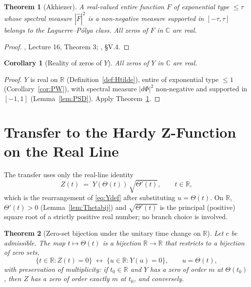 \documentclass[11pt]{article}
\newtheorem{theorem}{Theorem}
\newtheorem{corollary}{Corollary}
\begin{document}
\begin{theorem}[Akhiezer]\label{thm:akhiezer}
A real-valued entire function $F$ of exponential type $\le\tau$ whose spectral measure $|\hat F|^2$ is a non-negative measure supported in $[-\tau,\tau]$ belongs to the Laguerre--P\'olya class. All zeros of $F$ in $\mathbb{C}$ are real.
\end{theorem}

\begin{proof}\cite{Levin}, Lecture 16, Theorem 3; \cite{Akhiezer}, \S V.4.\end{proof}

\begin{corollary}[Reality of zeros of $Y$]\label{cor:Hzero}
All zeros of $Y$ in $\mathbb{C}$ are real.
\end{corollary}

\begin{proof}
$Y$ is real on $\mathbb{R}$ (Definition~\ref{def:Htilde}), entire of exponential type $\le 1$ (Corollary~\ref{cor:PW}), with spectral measure $|d\Phi|^2$ non-negative and supported in $[-1,1]$ (Lemma~\ref{lem:PSD}). Apply Theorem~\ref{thm:akhiezer}.
\end{proof}

\section{Transfer to the Hardy Z-Function on the Real Line}

The transfer uses only the real-line identity
\begin{equation}\label{eq:UTCreal}
Z(t) \;=\; Y(\Theta(t))\,\sqrt{\Theta'(t)},\qquad t\in\mathbb{R},
\end{equation}
which is the rearrangement of \eqref{eq:Ydef} after substituting $u=\Theta(t)$. On $\mathbb{R}$, $\Theta'(t)>0$ (Lemma~\ref{lem:Thetabij}) and $\sqrt{\Theta'(t)}$ is the principal (positive) square root of a strictly positive real number; no branch choice is involved.

\begin{theorem}[Zero-set bijection under the unitary time change on $\mathbb{R}$]\label{thm:UTCzero}
Let $c$ be admissible. The map $t\mapsto\Theta(t)$ is a bijection $\mathbb{R}\to\mathbb{R}$ that restricts to a bijection of zero sets,
\begin{equation}\label{eq:ZeroBij}
\{t\in\mathbb{R}:Z(t)=0\}\;\longleftrightarrow\;\{u\in\mathbb{R}:Y(u)=0\},\qquad u=\Theta(t),
\end{equation}
with preservation of multiplicity: if $t_0\in\mathbb{R}$ and $Y$ has a zero of order $m$ at $\Theta(t_0)$, then $Z$ has a zero of order exactly $m$ at $t_0$, and conversely.
\end{theorem}
\end{document}
